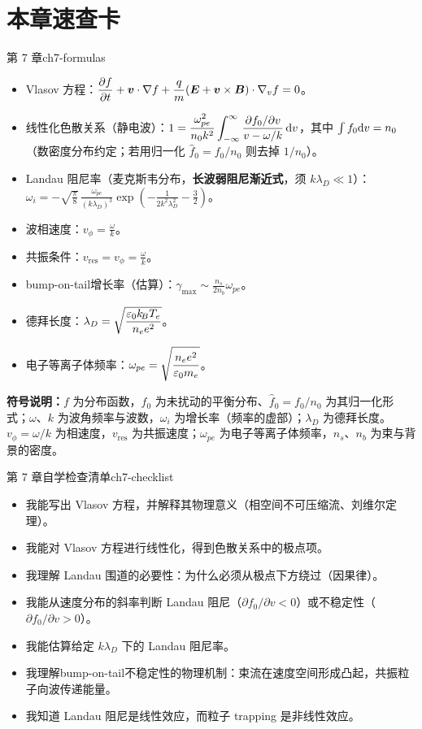 \section*{本章速查卡}
{}
\begin{formulabox}{第 7 章}{ch7-formulas}
\begin{itemize}[leftmargin=*,itemsep=0pt]
\item Vlasov 方程：$\displaystyle\frac{\partial f}{\partial t} + \bm{v}\cdot\nabla f + \frac{q}{m}(\bm{E} + \bm{v}\times\bm{B})\cdot\nabla_v f = 0$。
\item 线性化色散关系（静电波）：$\displaystyle 1 = \frac{\omega_{pe}^2}{n_0k^2}\int_{-\infty}^{\infty} \frac{\partial f_0/\partial v}{v - \omega/k}\,\mathrm{d} v$，其中 $\int f_0\mathrm{d} v=n_0$（数密度分布约定；若用归一化 $\hat f_0=f_0/n_0$ 则去掉 $1/n_0$）。
\item Landau 阻尼率（麦克斯韦分布，\textbf{长波弱阻尼渐近式}，须 $k\lambda_D\ll1$）：$\displaystyle\omega_i = -\sqrt{\frac{\pi}{8}}\,\frac{\omega_{pe}}{(k\lambda_D)^3}\exp\!\left(-\frac{1}{2k^2\lambda_D^2} - \frac{3}{2}\right)$。
\item 波相速度：$\displaystyle v_\phi = \frac{\omega}{k}$。
\item 共振条件：$\displaystyle v_{\text{res}} = v_\phi = \frac{\omega}{k}$。
\item bump-on-tail增长率（估算）：$\displaystyle\gamma_{\max} \sim \frac{n_s}{2n_b}\omega_{pe}$。
\item 德拜长度：$\displaystyle\lambda_D = \sqrt{\frac{\varepsilon_0 k_{\!B}T_e}{n_e e^2}}$。
\item 电子等离子体频率：$\displaystyle\omega_{pe} = \sqrt{\frac{n_e e^2}{\varepsilon_0 m_e}}$。
\end{itemize}
\textbf{符号说明：}$f$ 为分布函数，$f_0$ 为未扰动的平衡分布、$\hat f_0=f_0/n_0$ 为其归一化形式；$\omega$、$k$ 为波角频率与波数，$\omega_i$ 为增长率（频率的虚部）；$\lambda_D$ 为德拜长度。$v_\phi=\omega/k$ 为相速度，$v_{\text{res}}$ 为共振速度；$\omega_{pe}$ 为电子等离子体频率，$n_s$、$n_b$ 为束与背景的密度。
\end{formulabox}

\begin{checklistbox}{第 7 章自学检查清单}{ch7-checklist}
\begin{itemize}[leftmargin=*,label=$\square$]
\item 我能写出 Vlasov 方程，并解释其物理意义（相空间不可压缩流、刘维尔定理）。
\item 我能对 Vlasov 方程进行线性化，得到色散关系中的极点项。
\item 我理解 Landau 围道的必要性：为什么必须从极点下方绕过（因果律）。
\item 我能从速度分布的斜率判断 Landau 阻尼（$\partial f_0/\partial v < 0$）或不稳定性（$\partial f_0/\partial v > 0$）。
\item 我能估算给定 $k\lambda_D$ 下的 Landau 阻尼率。
\item 我理解bump-on-tail不稳定性的物理机制：束流在速度空间形成凸起，共振粒子向波传递能量。
\item 我知道 Landau 阻尼是线性效应，而粒子 trapping 是非线性效应。
\end{itemize}
\end{checklistbox}


\endinput

